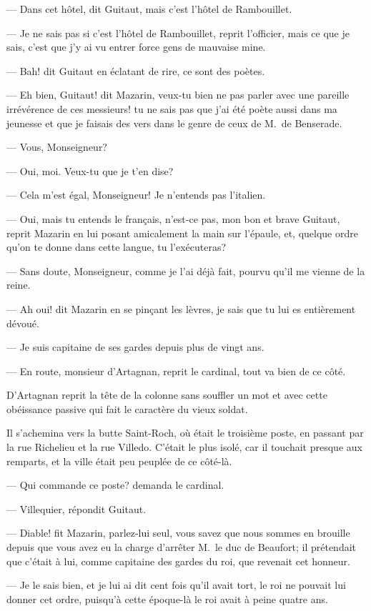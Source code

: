 — Dans cet hôtel, dit Guitaut, mais c'est l'hôtel de Rambouillet.

— Je ne sais pas si c'est l'hôtel de Rambouillet, reprit l'officier, mais ce que je sais, c'est que j'y ai vu entrer force gens de mauvaise mine.

— Bah! dit Guitaut en éclatant de rire, ce sont des poètes.

— Eh bien, Guitaut! dit Mazarin, veux-tu bien ne pas parler avec une pareille irrévérence de ces messieurs! tu ne sais pas que j'ai été poète aussi dans ma jeunesse et que je faisais des vers dans le genre de ceux de M.~de Benserade.

— Vous, Monseigneur?

— Oui, moi. Veux-tu que je t'en dise?

— Cela m'est égal, Monseigneur! Je n'entends pas l'italien.

— Oui, mais tu entends le français, n'est-ce pas, mon bon et brave Guitaut, reprit Mazarin en lui posant amicalement la main sur l'épaule, et, quelque ordre qu'on te donne dans cette langue, tu l'exécuteras?

— Sans doute, Monseigneur, comme je l'ai déjà fait, pourvu qu'il me vienne de la reine.

— Ah oui! dit Mazarin en se pinçant les lèvres, je sais que tu lui es entièrement dévoué.

— Je suis capitaine de ses gardes depuis plus de vingt ans.

— En route, monsieur d'Artagnan, reprit le cardinal, tout va bien de ce côté.

D'Artagnan reprit la tête de la colonne sans souffler un mot et avec cette obéissance passive qui fait le caractère du vieux soldat.

Il s'achemina vers la butte Saint-Roch, où était le troisième poste, en passant par la rue Richelieu et la rue Villedo. C'était le plus isolé, car il touchait presque aux remparts, et la ville était peu peuplée de ce côté-là.

— Qui commande ce poste? demanda le cardinal.

— Villequier, répondit Guitaut.

— Diable! fit Mazarin, parlez-lui seul, vous savez que nous sommes en brouille depuis que vous avez eu la charge d'arrêter M.~le duc de Beaufort; il prétendait que c'était à lui, comme capitaine des gardes du roi, que revenait cet honneur.

— Je le sais bien, et je lui ai dit cent fois qu'il avait tort, le roi ne pouvait lui donner cet ordre, puisqu'à cette époque-là le roi avait à peine quatre ans.

